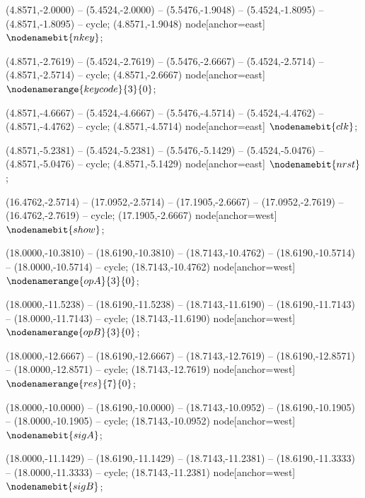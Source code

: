    (4.8571,-2.0000) -- (5.4524,-2.0000) -- (5.5476,-1.9048) -- (5.4524,-1.8095) -- (4.8571,-1.8095) -- cycle;
   (4.8571,-1.9048) node[anchor=east] {$\nodenamebit{nkey}$};

   (4.8571,-2.7619) -- (5.4524,-2.7619) -- (5.5476,-2.6667) -- (5.4524,-2.5714) -- (4.8571,-2.5714) -- cycle;
   (4.8571,-2.6667) node[anchor=east] {$\nodenamerange{keycode}{3}{0}$};

   (4.8571,-4.6667) -- (5.4524,-4.6667) -- (5.5476,-4.5714) -- (5.4524,-4.4762) -- (4.8571,-4.4762) -- cycle;
   (4.8571,-4.5714) node[anchor=east] {$\nodenamebit{clk}$};

   (4.8571,-5.2381) -- (5.4524,-5.2381) -- (5.5476,-5.1429) -- (5.4524,-5.0476) -- (4.8571,-5.0476) -- cycle;
   (4.8571,-5.1429) node[anchor=east] {$\nodenamebit{nrst}$};

   (16.4762,-2.5714) -- (17.0952,-2.5714) -- (17.1905,-2.6667) -- (17.0952,-2.7619) -- (16.4762,-2.7619) -- cycle;
   (17.1905,-2.6667) node[anchor=west] {$\nodenamebit{show}$};

   (18.0000,-10.3810) -- (18.6190,-10.3810) -- (18.7143,-10.4762) -- (18.6190,-10.5714) -- (18.0000,-10.5714) -- cycle;
   (18.7143,-10.4762) node[anchor=west] {$\nodenamerange{opA}{3}{0}$};

   (18.0000,-11.5238) -- (18.6190,-11.5238) -- (18.7143,-11.6190) -- (18.6190,-11.7143) -- (18.0000,-11.7143) -- cycle;
   (18.7143,-11.6190) node[anchor=west] {$\nodenamerange{opB}{3}{0}$};

   (18.0000,-12.6667) -- (18.6190,-12.6667) -- (18.7143,-12.7619) -- (18.6190,-12.8571) -- (18.0000,-12.8571) -- cycle;
   (18.7143,-12.7619) node[anchor=west] {$\nodenamerange{res}{7}{0}$};

   (18.0000,-10.0000) -- (18.6190,-10.0000) -- (18.7143,-10.0952) -- (18.6190,-10.1905) -- (18.0000,-10.1905) -- cycle;
   (18.7143,-10.0952) node[anchor=west] {$\nodenamebit{sigA}$};

   (18.0000,-11.1429) -- (18.6190,-11.1429) -- (18.7143,-11.2381) -- (18.6190,-11.3333) -- (18.0000,-11.3333) -- cycle;
   (18.7143,-11.2381) node[anchor=west] {$\nodenamebit{sigB}$};

